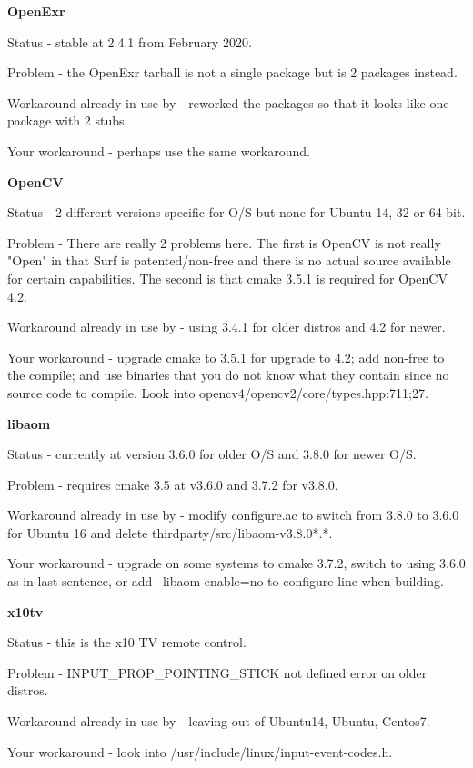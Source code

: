 \textbf{OpenExr} 
\begin{description}[noitemsep]
     \item Status - stable at 2.4.1 from February 2020.
     \item Problem - the OpenExr tarball is not a single package but is 2 packages instead.
     \item Workaround already in use by \CGG{} - reworked the packages so that it looks like
one package with 2 stubs.
     \item Your workaround - perhaps use the same workaround.
\end{description}

\textbf{OpenCV}
\begin{description}[noitemsep]
     \item Status - 2 different versions specific for O/S but none for Ubuntu 14, 32 or 64 bit.
     \item Problem - There are really 2 problems here.  The first is OpenCV is not really
"Open" in that Surf is patented/non-free and there is no actual source available for certain
capabilities. The second is that cmake 3.5.1 is required for OpenCV 4.2.
     \item Workaround already in use by \CGG{} - using 3.4.1 for older distros and 4.2 for newer.
     \item Your workaround - upgrade cmake to 3.5.1 for upgrade to 4.2; add non-free to the
compile; and use binaries that you do not know what they contain since no source code to compile.
Look into opencv4/opencv2/core/types.hpp:711;27.
\end{description}

\textbf{libaom}
\begin{description}[noitemsep]
     \item Status - currently at version 3.6.0 for older O/S and 3.8.0 for newer O/S.
     \item Problem - requires cmake 3.5 at v3.6.0 and 3.7.2 for v3.8.0.
     \item Workaround already in use by \CGG{} - modify configure.ac to switch from 3.8.0 to 3.6.0 for Ubuntu 16 and delete thirdparty/src/libaom-v3.8.0*.*.
     \item Your workaround - upgrade on some systems to cmake 3.7.2, switch to using 3.6.0 as in last sentence, or add --libaom-enable=no to configure line when building.
\end{description}

\textbf{x10tv}
\begin{description}[noitemsep]
     \item Status - this is the x10 TV remote control.
     \item Problem - INPUT\_PROP\_POINTING\_STICK not defined error on older distros.
     \item Workaround already in use by \CGG{} - leaving out of Ubuntu14, Ubuntu, Centos7.
     \item Your workaround - look into /usr/include/linux/input-event-codes.h.
\end{description}


